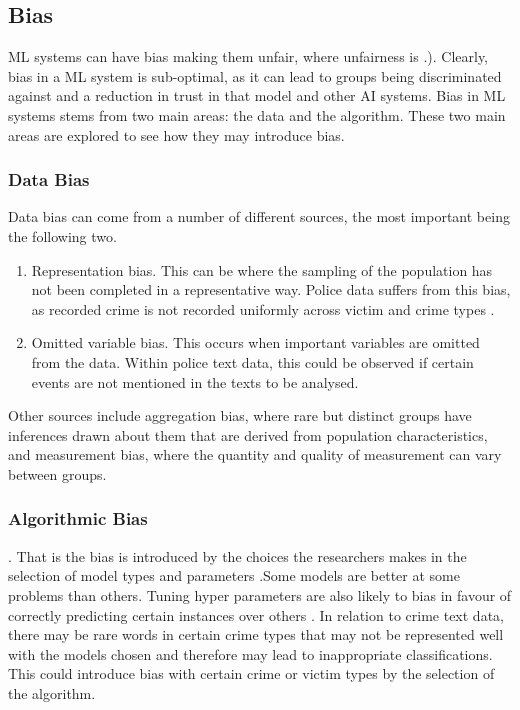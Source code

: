 \subsection{Bias} ML systems can have bias making them unfair, where unfairness is  \parencite{mehrabi2021survey}.). Clearly, bias in a ML system is sub-optimal, as it can lead to groups being discriminated against and a reduction in trust in that model and other AI systems. Bias in ML systems stems from two main areas: the data and the algorithm. These two main areas are explored to see how they may introduce bias.

\subsubsection{Data Bias} Data bias can come from a number of different sources, the most important being the following two. 

\begin{enumerate}
\item{Representation bias}. This can be where the sampling of the population has not been completed in a representative way. Police data suffers from this bias, as recorded crime is not recorded uniformly across victim and crime types  \parencite{baumer2002neighborhood , tarling2010reporting }.

\item{Omitted variable bias}. This occurs when important variables are omitted from the data. Within police text data, this could be observed if certain events are not mentioned in the texts to be analysed. 
\end{enumerate} 

Other sources include aggregation bias, where rare but distinct groups have inferences drawn about them that are derived from population characteristics, and measurement bias, where the quantity and quality of measurement can vary between groups.

\subsubsection{Algorithmic Bias}  \parencite{mehrabi2021survey}. That is the bias is introduced by the choices the researchers makes in the selection of model types and parameters \parencite{hooker2021moving}.Some models are better at some problems than others. Tuning hyper parameters are also likely to bias in favour of correctly predicting certain instances over others \parencite{paiva2022relating}. In relation to crime text data, there may be rare words in certain crime types that may not be represented well with the models chosen and therefore may lead to inappropriate classifications. This could introduce bias with certain crime or victim types by the selection of the algorithm.

